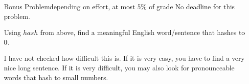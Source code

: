 \documentclass[a4paper]{article}
\begin{document}
\begin{problem}{Bonus Problem}{depending on effort, at most 5\% of grade}
No deadline for this problem.

Using $hash$ from above, find a meaningful English word/sentence that hashes to $0$.

I have not checked how difficult this is.
If it is very easy, you have to find a very nice long sentence.
If it is very difficult, you may also look for pronounceable words that hash to small numbers. 
\end{problem}
\end{document}
